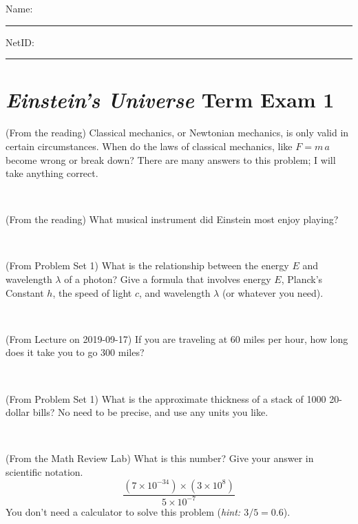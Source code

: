 \documentclass[12pt, letterpaper]{article}
\begin{document}
\noindent
Name: \rule[-1ex]{0.60\textwidth}{0.1pt}
NetID: \rule[-1ex]{0.20\textwidth}{0.1pt}

\section*{\textsl{Einstein's Universe} Term Exam 1}
\setcounter{problem}{1}


\begin{problem} (From the reading)
Classical mechanics, or Newtonian mechanics, is only valid in certain
circumstances. When do the laws of classical mechanics, like $F =
m\,a$ become wrong or break down? There are many answers to this
problem; I will take anything correct.
\end{problem}


\vfill ~

\begin{problem} (From the reading)
What musical instrument did Einstein most enjoy playing?
\end{problem}


\vfill ~

\begin{problem} (From Problem Set 1)
What is the relationship between the energy $E$ and wavelength
$\lambda$ of a photon? Give a formula that involves energy $E$,
Planck's Constant $h$, the speed of light $c$, and wavelength
$\lambda$ (or whatever you need).
\end{problem}

\vfill ~

\begin{problem} (From Lecture on 2019-09-17)
If you are traveling at 60 miles per hour, how long does
it take you to go 300 miles?
\end{problem}


\vfill ~


\clearpage


\begin{problem} (From Problem Set 1)
What is the approximate thickness of a stack of 1000 20-dollar bills?
No need to be precise, and use any units you like.
\end{problem}


\vfill ~

\begin{problem} (From the Math Review Lab)
What is this number? Give your answer in scientific notation.
$$
\frac{(7\times10^{-34})\times(3\times10^8)}{5\times10^{-7}}
$$
You don't need a calculator to solve this problem (\textit{hint: $3/5=0.6$}).
\end{problem}
\end{document}

